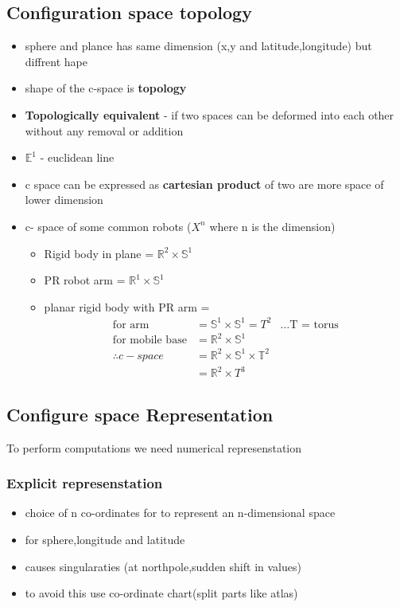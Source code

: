 \documentclass[a4paper]{article}
\begin{document}
\subsection{Configuration space topology}
\begin{itemize}
	\item sphere and plance has same dimension (x,y and latitude,longitude) but diffrent hape
	\item shape of the c-space is \textbf{topology}
	\item \textbf{Topologically equivalent}  - if two spaces can be deformed into each other without any removal or addition
	\item $\mathds{E}^1$ - euclidean line
	\item c space can be expressed as \textbf{cartesian product} of two are more space of lower dimension
	\item c- space of some common robots ($X^n$ where n is the dimension)
	      \begin{itemize}
		      \item Rigid body in plane = $\mathds{R}^2 \times \mathds{S}^1 $
		      \item PR robot arm = $\mathds{R}^1 \times \mathds{S}^1$
		      \item planar rigid body with PR arm = \begin{align*}
			            \text{for arm}         & = \mathds{S}^1 \times \mathds{S}^1 = T^2               & \ldots \text{T = torus} \\
			            \text{for mobile base} & =  \mathds{R}^2 \times \mathds{S}^1                                              \\
			            \therefore c-space     & = \mathds{R}^2 \times \mathds{S}^1 \times \mathds{T}^2                           \\
			                                   & = \mathds{R}^2 \times T^3
		            \end{align*}
	      \end{itemize}
\end{itemize}
\subsection{Configure space Representation}
To perform computations we need numerical represenstation
\subsubsection{Explicit represenstation}
\begin{itemize}
	\item choice of n co-ordinates for to represent an n-dimensional space
	\item for sphere,longitude and latitude
	\item causes singularaties (at northpole,sudden shift in values)
	\item to avoid this use co-ordinate  chart(split parts like atlas)
\end{itemize}
\end{document}
